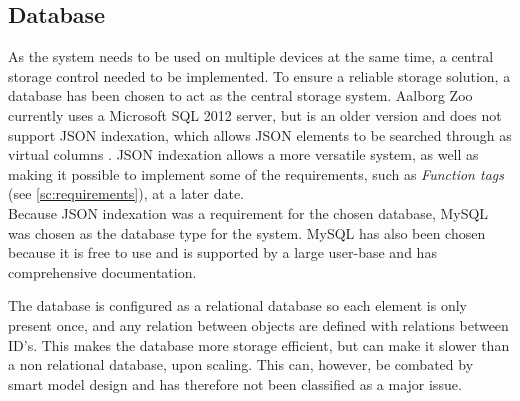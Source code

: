 \subsection{Database}\label{ssc:tech_database}
As the system needs to be used on multiple devices at the same time, a central storage control needed to be implemented. To ensure a reliable storage solution, a database has been chosen to act as the central storage system. Aalborg Zoo currently uses a Microsoft SQL 2012 server, but is an older version and does not support JSON indexation, which allows JSON elements to be searched through as virtual columns \cite{MySQLJSON}. JSON indexation allows a more versatile system, as well as making it possible to implement some of the requirements, such as \textit{Function tags} (see \autoref{sc:requirements}), at a later date.\\
Because JSON indexation was a requirement for the chosen database, MySQL was chosen as the database type for the system. MySQL has also been chosen because it is free to use and is supported by a large user-base and has comprehensive documentation.
\par
The database is configured as a relational database \cite{RelationalDB} so each element is only present once, and any relation between objects are defined with relations between ID's. This makes the database more storage efficient, but can make it slower than a non relational database, upon scaling. This can, however, be combated by smart model design and has therefore not been classified as a major issue.\\